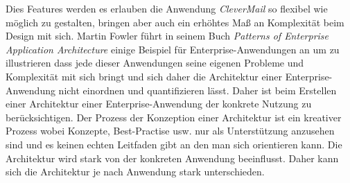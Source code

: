 Dies Features werden es erlauben die Anwendung \emph{CleverMail} so flexibel wie möglich zu gestalten, bringen aber auch ein erhöhtes Maß an Komplexität beim Design mit sich. Martin Fowler führt in seinem Buch \emph{Patterns of Enterprise Application Architecture}\cite[5-6]{patternsOfEnterprise} einige Beispiel für Enterprise-Anwendungen an um zu illustrieren dass jede dieser Anwendungen seine eigenen Probleme und Komplexität mit sich bringt und sich daher die Architektur einer Enterprise-Anwendung nicht einordnen und quantifizieren lässt. Daher ist beim Erstellen einer Architektur einer Enterprise-Anwendung der konkrete Nutzung zu berücksichtigen. Der Prozess der Konzeption einer Architektur ist ein kreativer Prozess wobei Konzepte, Best-Practise usw. nur als Unterstützung anzusehen sind und es keinen echten Leitfaden gibt an den man sich orientieren kann. Die Architektur wird stark von der konkreten Anwendung beeinflusst. Daher kann sich die Architektur je nach Anwendung stark unterschieden.
\newpage
